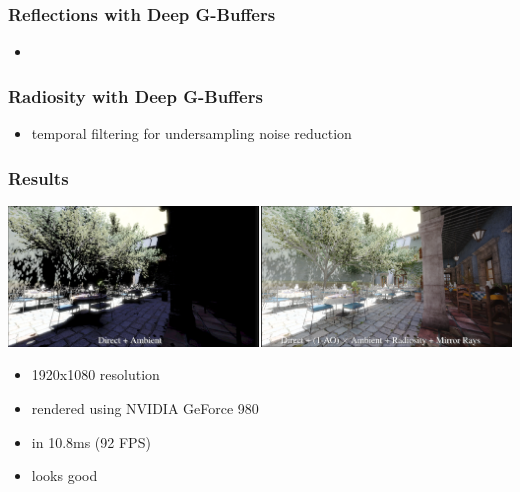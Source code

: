 \documentclass[aspectratio=169]{beamer}
\begin{document}
	\begin{frame}
		\frametitle{Reflections with Deep G-Buffers}
		\begin{itemize}
			\item 
			
		\end{itemize}
	\end{frame}	

	\begin{frame}
		\frametitle{Radiosity with Deep G-Buffers}
		\begin{itemize}
			\item temporal filtering for undersampling noise reduction
			
		\end{itemize}
	\end{frame}	

	\begin{frame}
		\frametitle{Results}
		\includegraphics[width=\textwidth]{img/deep_g_buffer_render.png}
		\begin{itemize}
			\item 1920x1080 resolution
			\item rendered using NVIDIA GeForce 980
			\item in 10.8ms (92 FPS)
			\item looks good
		\end{itemize}
	\end{frame}
\end{document}
